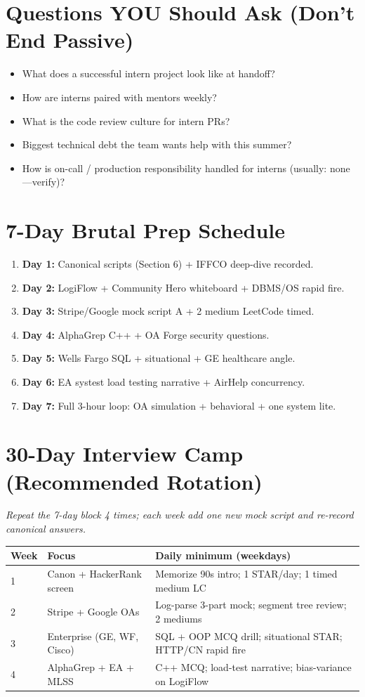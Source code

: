 \documentclass[9pt,a4paper]{article}
\begin{document}
\section{Questions YOU Should Ask (Don't End Passive)}
\begin{itemize}
  \item What does a successful intern project look like at handoff?
  \item How are interns paired with mentors weekly?
  \item What is the code review culture for intern PRs?
  \item Biggest technical debt the team wants help with this summer?
  \item How is on-call / production responsibility handled for interns (usually: none---verify)?
\end{itemize}

\section{7-Day Brutal Prep Schedule}
\begin{enumerate}
  \item \textbf{Day 1:} Canonical scripts (Section 6) + IFFCO deep-dive recorded.
  \item \textbf{Day 2:} LogiFlow + Community Hero whiteboard + DBMS/OS rapid fire.
  \item \textbf{Day 3:} Stripe/Google mock script A + 2 medium LeetCode timed.
  \item \textbf{Day 4:} AlphaGrep C++ + OA Forge security questions.
  \item \textbf{Day 5:} Wells Fargo SQL + situational + GE healthcare angle.
  \item \textbf{Day 6:} EA systest load testing narrative + AirHelp concurrency.
  \item \textbf{Day 7:} Full 3-hour loop: OA simulation + behavioral + one system lite.
\end{enumerate}

\section{30-Day Interview Camp (Recommended Rotation)}
\textit{Repeat the 7-day block 4 times; each week add one new mock script and re-record canonical answers.}

\begin{longtable}{@{}p{1.2cm}p{5.5cm}p{8cm}@{}}
\toprule
\textbf{Week} & \textbf{Focus} & \textbf{Daily minimum (weekdays)} \\
\midrule
\endhead
1 & Canon + HackerRank screen & Memorize 90s intro; 1 STAR/day; 1 timed medium LC \\
2 & Stripe + Google OAs & Log-parse 3-part mock; segment tree review; 2 mediums \\
3 & Enterprise (GE, WF, Cisco) & SQL + OOP MCQ drill; situational STAR; HTTP/CN rapid fire \\
4 & AlphaGrep + EA + MLSS & C++ MCQ; load-test narrative; bias-variance on LogiFlow \\
\bottomrule
\end{longtable}
\end{document}
